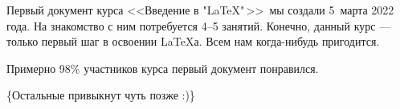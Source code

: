 \documentclass[14pt,fleqn]{article}
\begin{document}
	
	Первый документ курса <<Введение в "LaTeX"\,>>\ мы создали 5~марта 2022 года. На знакомство с ним потребуется 4--5 занятий. Конечно, данный курс --- только первый шаг в освоении \LaTeX а. Всем нам когда-нибудь пригодится.
	
	Примерно 98\% участников курса первый документ понравился.
	
	\{Остальные привыкнут чуть позже :)\}
\end{document}
